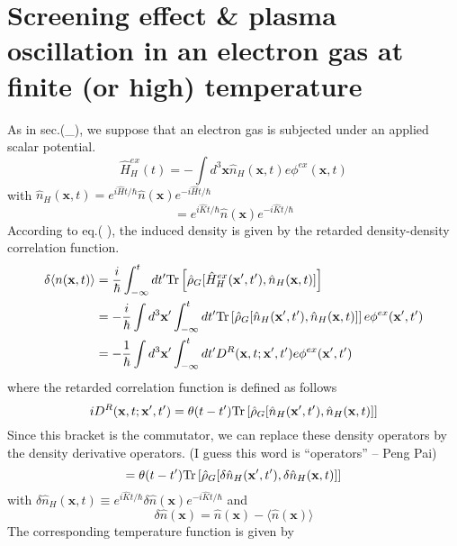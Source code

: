 \section{Screening effect \& plasma oscillation in an electron gas at finite (or high) temperature}
 As in sec.(\_), we suppose that an electron gas is subjected under an applied scalar potential.
\begin{equation}
\hat H^{ex}_H(t)=-\int d^3\mathbf x \hat n_H(\mathbf x,t) e\phi^{ex}(\mathbf x,t)
\end{equation}
with $\hat n_H(\mathbf x ,t)=e^{i \hat H t/\hbar} \hat n(\mathbf x)e^{-i \hat Ht/\hbar}$
\begin{equation}
[\hat n(\mathbf x),\hat N]=e^{i \hat K t/\hbar} \hat n(\mathbf x)e^{-i \hat Kt/\hbar}
\end{equation}
According to eq.( ), the induced density is given by the retarded density-density correlation function.
\begin{equation}
\begin{aligned}
\delta\langle n(\mathbf x,t)\rangle &=\frac{i}{\hbar} \int_{-\infty}^t dt' \text{Tr}\left[ \hat \rho_G[\hat H^{ex}_H(\mathbf x',t'),\hat n_H(\mathbf x,t)] \right]\\
&=-\frac{i}{\hbar}\int d^3 \mathbf x' \int_{-\infty}^t dt' \text{Tr}\left[ \hat \rho_G[\hat n_H(\mathbf x',t'),\hat n_H(\mathbf x,t)] \right] e\phi^{ex}(\mathbf x',t')\\
&=-\frac{1}{\hbar} \int d^3 \mathbf x' \int_{-\infty}^t dt' D^R(\mathbf x,t;\mathbf x',t')e\phi^{ex}(\mathbf x',t')
\end{aligned}
\end{equation}
where the retarded correlation function is defined as follows
\[
iD^R(\mathbf x,t;\mathbf x',t')=\theta(t-t')\text{Tr}\left[ \hat \rho_G[\hat n_H(\mathbf x',t'),\hat n_H(\mathbf x,t)] \right]
\]
Since this bracket is the commutator, we can replace these density operators by the density derivative operators. (I guess this word is ``operators'' -- Peng Pai)
\begin{equation}
=\theta(t-t')\text{Tr} \left[ \hat \rho_G[\delta \hat n_H(\mathbf x',t'),\delta \hat n_H(\mathbf x,t)] \right]
\end{equation}
with $\delta \hat n_H(\mathbf x,t)\equiv e^{i\hat K t/\hbar}\delta \hat n(\mathbf x)e^{-i\hat Kt/\hbar}$ and
\begin{equation}\tag{4.9.4'}
\delta \hat n(\mathbf x)=\hat n(\mathbf x)-\langle \hat n(\mathbf x)\rangle
\end{equation}
 The corresponding temperature function is given by 
